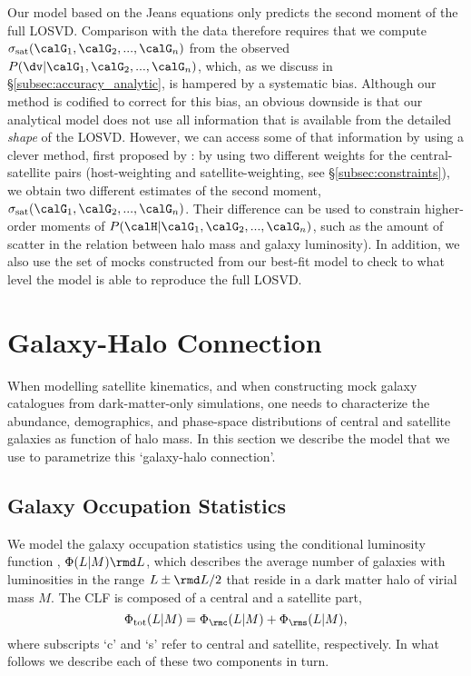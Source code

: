 \documentclass[fleqn,usenatbib,useAMS]{mnras}
\begin{document}
	Our model based on the Jeans equations only predicts the second moment of the full LOSVD. Comparison with the data therefore requires that we compute $\sigma_{\rm sat}(\calG_1, \calG_2,...,\calG_n)$ from the observed $P(\dv |\calG_1, \calG_2,...,\calG_n)$, which, as we discuss in \S\ref{subsec:accuracy_analytic}, is hampered by a systematic bias. Although our method is codified to correct for this bias, an obvious downside is that our analytical model does not use all information that is available from the detailed {\it shape} of the LOSVD. However, we can access some of that information by using a clever method, first proposed by \cite{More+09a}: by using two different weights for the central-satellite pairs (host-weighting and satellite-weighting, see \S\ref{subsec:constraints}), we obtain two different estimates of the second moment, $\sigma_{\rm sat}(\calG_1, \calG_2,...,\calG_n)$. Their difference can be used to constrain higher-order moments of $P(\calH | \calG_1, \calG_2,...,\calG_n)$, such as the amount of scatter in the relation between halo mass and galaxy luminosity). In addition, we also use the set of mocks constructed from our best-fit model to check to what level the model is able to reproduce the full LOSVD. 
	
	\section{Galaxy-Halo Connection}
	\label{sec:galaxy-halo_connection}
	
	When modelling satellite kinematics, and when constructing mock galaxy catalogues from dark-matter-only simulations, one needs to characterize the abundance, demographics, and phase-space distributions of central and satellite galaxies as function of halo mass. In this section we describe the model that we use to parametrize this `galaxy-halo connection'.
	
	\subsection{Galaxy Occupation Statistics}
	\label{sec:CLF}
	
	We model the galaxy occupation statistics using the conditional luminosity function \citep[CLF;][]{Yang+03}, $\Phi(L|M) \rmd L$, which describes the average number of galaxies with luminosities in the range $L \pm \rmd L/2$ that reside in a dark matter halo of virial mass $M$. The CLF is composed of a central and a satellite part,
	\begin{equation}
	\Phi_{\rm tot}(L | M) = \Phi_\rmc (L | M) + \Phi_\rms (L | M),
	\end{equation}
	where subscripts `c' and `s' refer to central and satellite, respectively. In what follows we describe each of these two components in turn.
	
\end{document}
